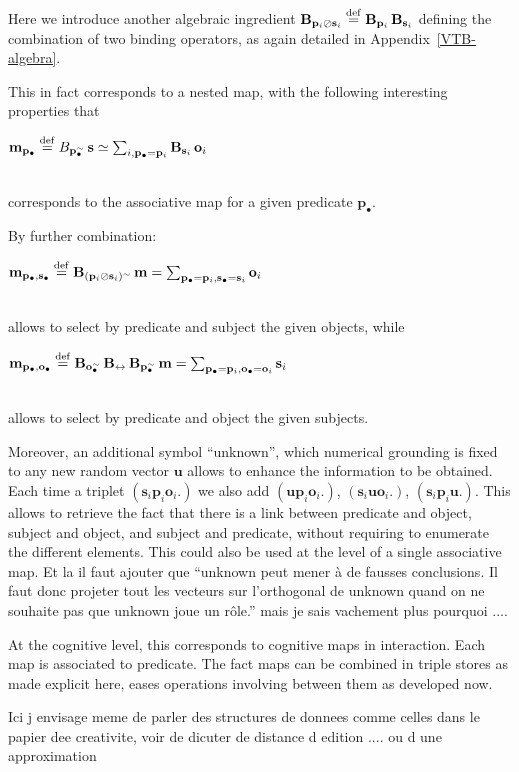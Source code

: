 \documentclass[a4]{article}
\newcommand{\vthierry}[2]{{\color{magenta} #1} \sout{#2}}
\newcommand{\deq}{\stackrel {\rm def}{=}}
\newcommand{\eqline}[1]{~\vspace{0.1cm}\\\centerline{$#1$}\vspace{0.1cm}\\}
\begin{document}
Here we introduce another algebraic ingredient $\mathbf{B}_{\mathbf{p}_i \oslash \mathbf{s}_i} \deq \mathbf{B}_{\mathbf{p}_i} \, \mathbf{B}_{\mathbf{s}_i}$ defining the combination of two binding operators, as again detailed in Appendix~\ref{VTB-algebra}.

This in fact corresponds to a nested map, with the following interesting properties that
\eqline{\mathbf{m}_{\mathbf{p}_\bullet} \deq  B_{{\mathbf{p}_\bullet^\sim}} \, \mathbf{s} \simeq \sum_{i, \mathbf{p}_\bullet = \mathbf{p}_i} \mathbf{B}_{\mathbf{s}_i} \, \mathbf{o}_i}
corresponds to the associative map for a given predicate $\mathbf{p}_\bullet$.

By further combination:
\eqline{\mathbf{m}_{\mathbf{p}_\bullet, \mathbf{s}_\bullet} \deq \mathbf{B}_{(\mathbf{p}_i \oslash \mathbf{s}_i)^\sim} \, \mathbf{m} = \sum_{\mathbf{p}_\bullet = \mathbf{p}_i, \mathbf{s}_\bullet = \mathbf{s}_i} \mathbf{o}_i}
allows to select by predicate and subject the given objects, while
\eqline{\mathbf{m}_{\mathbf{p}_\bullet, \mathbf{o}_\bullet} \deq 
\mathbf{B}_{\mathbf{o}_\bullet^\sim} \, \mathbf{B_{\leftrightarrow}} \,  \mathbf{B}_{{\mathbf{p}_\bullet^\sim}} \, \mathbf{m} = 
\sum_{\mathbf{p}_\bullet = \mathbf{p}_i, \mathbf{o}_\bullet = \mathbf{o}_i} \mathbf{s}_i}
allows to select by predicate and object the given subjects.

Moreover, an additional symbol ``unknown'', which numerical grounding is fixed to any new random vector $\mathbf{u}$ allows to enhance the information to be obtained. Each time a triplet $(\mathbf{s}_i \mathbf{p}_i \mathbf{o}_i.)$ we also add 
$(\mathbf{u} \mathbf{p}_i \mathbf{o}_i.)$, $(\mathbf{s}_i \mathbf{u} \mathbf{o}_i.)$, $(\mathbf{s}_i \mathbf{p}_i \mathbf{u}.)$. This allows to retrieve the fact that there is a link between predicate and object, subject and object, and subject and predicate, without requiring to enumerate the different elements. This could also be used at the level of a single associative map. \vthierry{Et la il faut ajouter que ``unknown peut mener à de fausses conclusions. Il faut donc projeter tout les vecteurs sur l’orthogonal de unknown quand on ne souhaite pas que unknown joue un rôle.'' mais je sais vachement plus pourquoi ....}{}

At the cognitive level, this corresponds to cognitive maps in interaction. Each map is associated to predicate. The fact maps can be combined in triple stores as made explicit here, eases operations involving between them as developed now.

\vthierry{Ici j envisage meme de parler des structures de donnees comme celles dans le papier dee creativite, voir de dicuter de distance d edition .... ou d une approximation}{}
\end{document}
